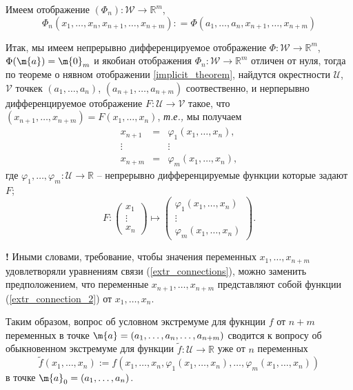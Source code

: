  
Имеем отображение $(\Phi_n): \mathscr{W} \to \mathbb{R}^m$,
\[
 \Phi_n(x_1,\ldots, x_n, x_{n+1}, \ldots, x_{n+m}): = \Phi(a_1,\ldots, a_n, x_{n+1}, \ldots, x_{n+m})
\]

Итак, мы имеем непрерывно дифференцируемое отображение $\Phi:\mathscr{W} \to \mathbb{R}^m$, $\Phi(\m{a}) = \m{0}_m$ и якобиан отображения $\Phi_n:\mathscr{W} \to \mathbb{R}^m$ отличен от нуля, тогда по теореме о нявном отображении \ref{implicit_theorem}, найдутся окрестности $\mathscr{U}$, $\mathscr{V}$ точкек $(a_1,\ldots, a_n)$, $(a_{n+1}, \ldots, a_{n+m})$ соотвественно, и нерперывно дифференцируемое отображение $F:\mathscr{U} \to \mathscr{V}$ такое, что $(x_{n+1}, \ldots, x_{n+m}) = F(x_1,\ldots, x_n)$, \textit{т.е.,} мы получаем 
\begin{equation}\label{extr_connection_2}
  \begin{matrix}
     x_{n+1} &=& \varphi_1(x_1, \ldots, x_n),\\
     \vdots & & \vdots \\
     x_{n+m} &=& \varphi_m(x_1,\ldots, x_n),
 \end{matrix}    
\end{equation}
где $\varphi_1,\ldots, \varphi_m: \mathscr{U} \to \mathbb{R}$ -- непрерывно дифференцируемые функции которые задают $F$;
\[
 F: \begin{pmatrix}
     x_1 \\
     \vdots \\
     x_n
 \end{pmatrix} \mapsto \begin{pmatrix}
     \varphi_1(x_1,\ldots, x_n) \\
     \vdots \\
     \varphi_m(x_1,\ldots, x_n)
 \end{pmatrix}.
\]

\begin{mydanger}{\bf{!}}
 Иными словами, требование, чтобы значения переменных $x_1,\ldots, x_{n+m}$ удовлетворяли уравнениям связи (\ref{extr_connections}), можно заменить предположением, что переменные $x_{n+1}, \ldots, x_{n+m}$ представляют собой функции (\ref{extr_connection_2}) от $x_1,\ldots, x_n$.    
\end{mydanger}

Таким образом, вопрос об условном экстремуме для фукнции $f$ от $n+m$ переменных в точке $\m{a} = (a_1,\ldots, a_n, \ldots, a_{n+m})$ сводится к вопросу об обыкновенном экстремуме для функции $\widetilde{f}:\mathscr{U} \to \mathbb{R}$ уже от $n$ переменных
\[
\widetilde{f}(x_1,\ldots, x_n):= f(x_1,\ldots, x_n, \varphi_1(x_1,\ldots, x_n), \ldots, \varphi_m(x_1,\ldots, x_n))
\]
в точке $\m{a}_0 = (a_1, \ldots, a_n)$.

